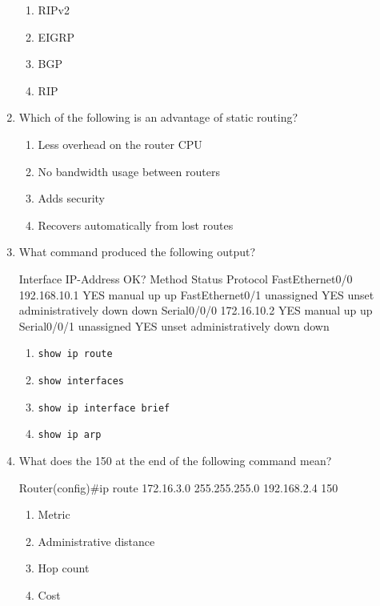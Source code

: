 \begin{enumerate}
  \begin{enumerate}
    \item
    RIPv2
  \item
    EIGRP
  \item
    BGP
  \item
    RIP
  \end{enumerate}
\item
  \protect\hypertarget{c09.xhtmlux5cux23Page_409}{}{}Which of the
  following is an advantage of static routing?

  \begin{enumerate}
    \item
    Less overhead on the router CPU
  \item
    No bandwidth usage between routers
  \item
    Adds security
  \item
    Recovers automatically from lost routes
  \end{enumerate}
\item
  What command produced the following output?

\begin{cli}
Interface         IP-Address      OK? Method Status             Protocol
FastEthernet0/0   192.168.10.1    YES manual up                    up
FastEthernet0/1   unassigned      YES unset  administratively down down
Serial0/0/0       172.16.10.2     YES manual up                    up
Serial0/0/1       unassigned      YES unset  administratively down down
\end{cli}

  \begin{enumerate}
    \item
    \texttt{show\ ip\ route}
  \item
    \texttt{show\ interfaces}
  \item
    \texttt{show\ ip\ interface\ brief}
  \item
    \texttt{show\ ip\ arp}
  \end{enumerate}
\item
  What does the 150 at the end of the following command mean?

\begin{cli}
Router(config)#ip route 172.16.3.0 255.255.255.0 192.168.2.4 150
\end{cli}

  \begin{enumerate}
    \item
    Metric
  \item
    Administrative distance
  \item
    Hop count
  \item
    Cost
  \end{enumerate}
\end{enumerate}
